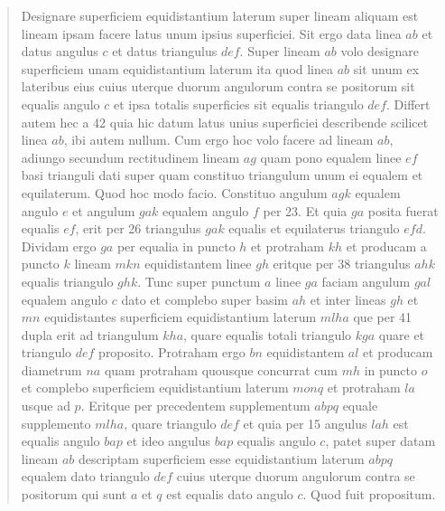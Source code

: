 \documentclass{article}
\begin{document}
\begin{quote}
Designare superficiem equidistantium laterum super lineam aliquam est
lineam ipsam facere latus unum ipsius superficiei. Sit ergo data linea $ab$ et
datus angulus $c$ et datus triangulus $def$. Super lineam $ab$ volo designare
superficiem unam equidistantium laterum ita quod linea $ab$ sit unum ex lateribus
eius cuius uterque duorum angulorum contra se positorum sit
equalis angulo $c$ et ipsa totalis superficies sit equalis triangulo $def$. Differt
autem hec a 42 quia hic datum latus unius superficiei describende scilicet
linea $ab$, ibi autem nullum. Cum ergo hoc volo facere ad lineam $ab$,
adiungo secundum rectitudinem lineam $ag$ quam pono equalem linee $ef$
basi trianguli dati super quam constituo triangulum unum ei equalem et
equilaterum. Quod hoc modo facio.
Constituo angulum $agk$ equalem angulo $e$
et angulum $gak$ equalem angulo $f$ per 23.
Et quia $ga$ posita fuerat equalis $ef$, erit per 26 triangulus $gak$ equalis et equilaterus triangulo $efd$.
Dividam ergo $ga$ per equalia in puncto $h$ et protraham $kh$ et producam
a puncto $k$ lineam $mkn$ equidistantem linee $gh$ eritque per 38 triangulus
$ahk$ equalis triangulo $ghk$.
Tunc super punctum $a$ linee $ga$ faciam
angulum $gal$ equalem angulo $c$ dato et complebo super basim $ah$ et inter
lineas $gh$ et $mn$ equidistantes superficiem equidistantium laterum $mlha$
que per 41 dupla erit ad triangulum $kha$, quare equalis totali triangulo 
$kga$ quare et triangulo $def$ proposito. Protraham ergo $bn$ equidistantem
$al$ et producam diametrum $na$ quam protraham quousque concurrat cum
$mh$ in puncto $o$ et complebo superficiem equidistantium laterum $monq$ et 
protraham $la$ usque ad $p$. Eritque per precedentem supplementum $abpq$
equale supplemento $mlha$, quare triangulo $def$ et quia per 15 angulus
$lah$ est equalis angulo $bap$ et ideo angulus $bap$ equalis angulo $c$, patet
super datam lineam $ab$ descriptam superficiem esse equidistantium laterum
$abpq$ equalem dato triangulo $def$ cuius uterque duorum angulorum
contra se positorum qui sunt $a$ et $q$ est equalis dato angulo $c$. Quod fuit
propositum.
\end{quote}
\end{document}

